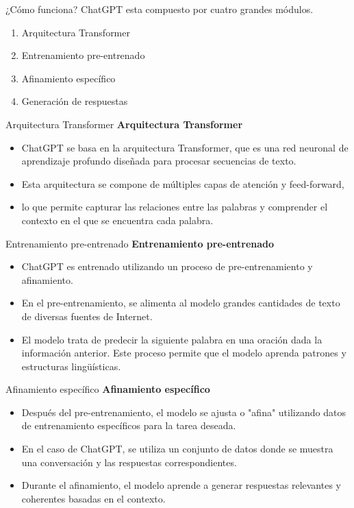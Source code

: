 \documentclass[11pt,aspectratio=169]{beamer}
\begin{document}
\begin{frame}{¿Cómo funciona?}
	ChatGPT esta compuesto por cuatro grandes módulos.
	\begin{enumerate}
		\item Arquitectura Transformer\pause
		\item Entrenamiento pre-entrenado\pause
		\item Afinamiento específico\pause
		\item Generación de respuestas
	\end{enumerate}
\end{frame}

\begin{frame}{Arquitectura Transformer}
	\textbf{Arquitectura Transformer}
	\begin{itemize}
		\item ChatGPT se basa en la arquitectura Transformer, que es una red neuronal de aprendizaje 
			profundo diseñada para procesar secuencias de texto. \pause
		\item Esta arquitectura se compone de múltiples capas de atención y feed-forward, \pause
		\item lo que permite capturar las relaciones entre las palabras y comprender el contexto en 
			el que se encuentra cada palabra.
	\end{itemize}
\end{frame}

\begin{frame}{Entrenamiento pre-entrenado}
	\textbf{Entrenamiento pre-entrenado}
	\begin{itemize}
		\item ChatGPT es entrenado utilizando un proceso de pre-entrenamiento y afinamiento.\pause 
		\item En el pre-entrenamiento, se alimenta al modelo grandes cantidades de texto de diversas fuentes de Internet.\pause 
		\item El modelo trata de predecir la siguiente palabra en una oración dada la información anterior. \pause 
		Este proceso permite que el modelo aprenda patrones y estructuras lingüísticas.
	\end{itemize}
\end{frame}

\begin{frame}{Afinamiento específico}
	\textbf{Afinamiento específico}
	\begin{itemize}
		\item Después del pre-entrenamiento, el modelo se ajusta o "afina" utilizando datos de entrenamiento 
			específicos para la tarea deseada.\pause
		\item En el caso de ChatGPT, se utiliza un conjunto de datos donde se muestra una conversación 
			y las respuestas correspondientes. \pause 
		\item Durante el afinamiento, el modelo aprende a generar respuestas relevantes y coherentes 
			basadas en el contexto.\pause
	\end{itemize}
\end{frame}
\end{document}
